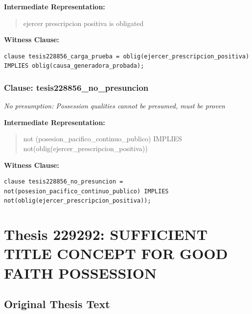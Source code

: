 \documentclass[11pt,a4paper]{article}
\begin{document}
\textbf{Intermediate Representation:}

\begin{quote}
ejercer prescripcion positiva is obligated
\end{quote}

\textbf{Witness Clause:}

\begin{lstlisting}[style=witnessstyle, language=Witness]
clause tesis228856_carga_prueba = oblig(ejercer_prescripcion_positiva) IMPLIES oblig(causa_generadora_probada);
\end{lstlisting}

\subsubsection{Clause: tesis228856\_no\_presuncion}

\textit{No presumption: Possession qualities cannot be presumed, must be proven}

\textbf{Intermediate Representation:}

\begin{quote}
not (posesion\_pacifico\_continuo\_publico) IMPLIES not(oblig(ejercer\_prescripcion\_positiva))
\end{quote}

\textbf{Witness Clause:}

\begin{lstlisting}[style=witnessstyle, language=Witness]
clause tesis228856_no_presuncion = not(posesion_pacifico_continuo_publico) IMPLIES not(oblig(ejercer_prescripcion_positiva));
\end{lstlisting}

\newpage

\section{Thesis 229292: SUFFICIENT TITLE CONCEPT FOR GOOD FAITH POSSESSION}
\label{thesis:229292}

\subsection{Original Thesis Text}
\end{document}
